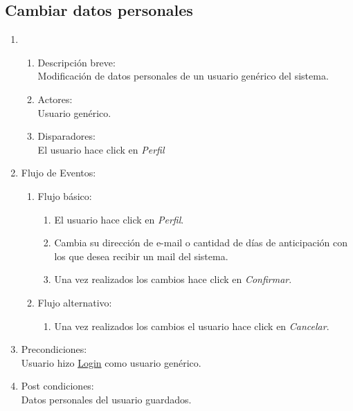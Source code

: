 \documentclass[a4paper,11pt]{article}
\begin{document}
\subsection{Cambiar datos personales}
\begin{enumerate}

    \item
    \begin{enumerate}
    \item Descripci\'on breve: \\
        Modificaci\'on de datos personales de un usuario gen\'erico del sistema.
    \item Actores: \\
        Usuario gen\'erico.
    \item Disparadores: \\
        El usuario hace click en \emph{Perfil}
    \end{enumerate}

    \item Flujo de Eventos:
    \begin{enumerate}

        \item Flujo b\'asico:
            \begin{enumerate}
                \item El usuario hace click en \emph{Perfil}.
                \item Cambia su direcci\'on de e-mail o cantidad de d\'ias de anticipaci\'on con los que desea recibir un mail del sistema.
                \item Una vez realizados los cambios hace click en \emph{Confirmar}.
            \end{enumerate}
        \item Flujo alternativo:
            \begin{enumerate}
                \item Una vez realizados los cambios el usuario hace click en \emph{Cancelar}.
            \end{enumerate}
    \end{enumerate}

    \item Precondiciones: \\
        Usuario hizo \underline{Login} como usuario gen\'erico.

    \item Post condiciones: \\
        Datos personales del usuario guardados.

\end{enumerate}
\end{document}
